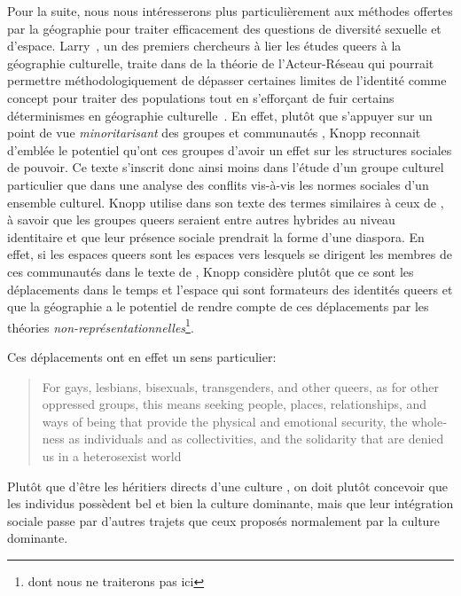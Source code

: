 Pour la suite, nous nous intéresserons plus particulièrement aux méthodes offertes par la géographie pour traiter efficacement des questions de diversité sexuelle et d'espace. 
Larry~\citet{Knopp2004}, un des premiers chercheurs à lier les études queers à la géographie culturelle, traite dans  de la théorie de l'Acteur-Réseau qui pourrait permettre méthodologiquement de dépasser certaines limites de l'identité comme concept pour traiter des populations \lgbt{} tout en s’efforçant de fuir certains déterminismes en géographie culturelle~\citep{Knopp2004}. 
En effet, plutôt que s'appuyer sur un point de vue \emph{minoritarisant} des groupes et communautés \lgbt{}, Knopp reconnait d'emblée le potentiel qu'ont ces groupes d'avoir un effet sur les structures sociales de pouvoir. 
Ce texte s'inscrit donc ainsi moins dans l'étude d'un groupe culturel particulier que dans une analyse des conflits vis-à-vis les normes sociales d'un ensemble culturel. 
Knopp utilise dans son texte des termes similaires à ceux de \citet{Sinfield1996}, à savoir que les groupes queers seraient entre autres hybrides au niveau identitaire et que leur présence sociale prendrait la forme d'une diaspora. 
En effet, si les espaces queers sont les espaces vers lesquels se dirigent les membres de ces communautés dans le texte de \citet{Sinfield1996}, Knopp considère plutôt que ce sont les déplacements dans le temps et l'espace qui sont formateurs des identités queers et que la géographie a le potentiel de rendre compte de ces déplacements par les théories \emph{non-représentationnelles}\footnote{dont nous ne traiterons pas ici}.

Ces déplacements ont en effet un sens particulier:
\foreignblockquote{english}[{\cite[123]{Knopp2004}}][.]{For gays, lesbians,
  bisexuals, transgenders, and other queers, as for other oppressed groups, this
  means seeking people, places, relationships, and ways of being that provide
  the physical and emotional security, the wholeness as individuals and as
  collectivities, and the solidarity that are denied us in a heterosexist world}
Plutôt que d'être les héritiers directs d'une culture \qu{}, on doit plutôt concevoir que les individus \qus{} possèdent bel et bien la culture dominante, mais que leur intégration sociale passe par d'autres trajets que ceux proposés normalement par la culture dominante.

